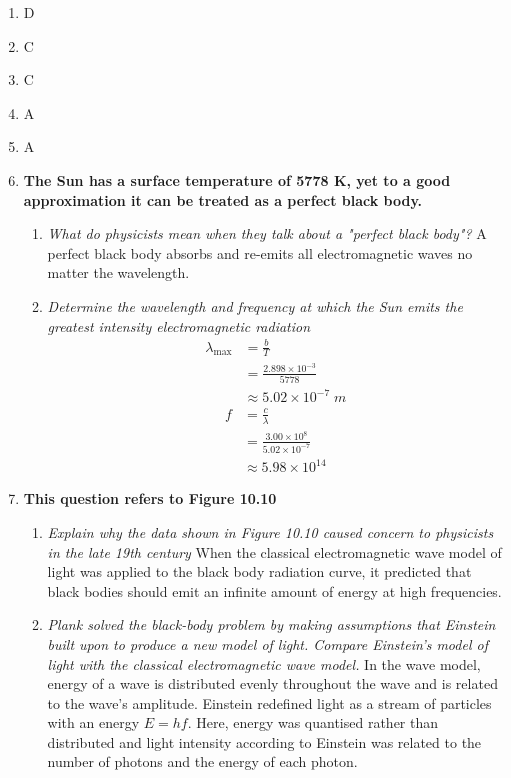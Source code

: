 \documentclass{report}
\begin{document}
		\begin{enumerate}
			\item D
			\item C
			\item C
			\item A
			\item A
			\item \textbf{The Sun has a surface temperature of 5778 K, yet to a good approximation it can be treated as a perfect black body.}
				\begin{enumerate}
					\item \textit{What do physicists mean when they talk about a "perfect black body"?}
						\subitem A perfect black body absorbs and re-emits all electromagnetic waves no matter the wavelength.

					\item \textit{Determine the wavelength and frequency at which the Sun emits the greatest intensity electromagnetic radiation}
						\begin{align*}
							\lambda_\text{max} &= \frac{b}{T} \\
									   &= \frac{2.898 \times 10^{-3}}{5778} \\
									   &\approx 5.02 \times 10^{-7} \; m
						\end{align*}
						\begin{align*}
							f &= \frac{c}{\lambda} \\
							  &= \frac{3.00 \times 10^8}{5.02 \times 10^{-7}} \\
							  &\approx 5.98 \times 10^{14}
						\end{align*}
				\end{enumerate}

			\item \textbf{This question refers to Figure 10.10}

				\begin{enumerate}
					\item \textit{Explain why the data shown in Figure 10.10 caused concern to physicists in the late 19th century}
						\subitem When the classical electromagnetic wave model of light was applied to the black body radiation curve, it predicted that black bodies should emit an infinite amount of energy at high frequencies.

					\item \textit{Plank solved the black-body problem by making assumptions that Einstein built upon to produce a new model of light. Compare Einstein's model of light with the classical electromagnetic wave model.}
						\subitem In the wave model, energy of a wave is distributed evenly throughout the wave and is related to the wave's amplitude. Einstein redefined light as a stream of particles with an energy $E=hf$. Here, energy was quantised rather than distributed and light intensity according to Einstein was related to the number of photons and the energy of each photon.
				\end{enumerate}


\end{enumerate}
\end{document}
